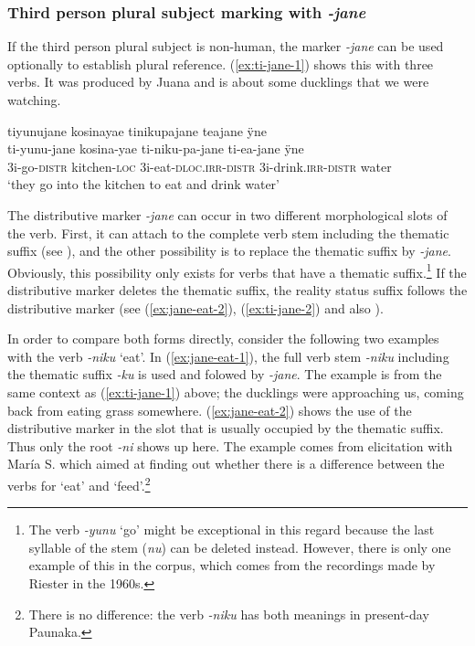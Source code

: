 \subsubsection{Third person plural subject marking with \textit{-jane}} If the third person plural subject is non-human, the marker \textit{-jane} can be used optionally to establish plural reference. (\ref{ex:ti-jane-1}) shows this with three verbs. It was produced by Juana and is about some ducklings that we were watching.
 
 \ea\label{ex:ti-jane-1}
\begingl 
\glpreamble tiyunujane kosinayae tinikupajane teajane ÿne\\
\gla ti-yunu-jane kosina-yae ti-niku-pa-jane ti-ea-jane ÿne\\ 
\glb 3i-go-\textsc{distr} kitchen-\textsc{loc} 3i-eat-\textsc{dloc.irr}-\textsc{distr} 3i-drink.\textsc{irr}-\textsc{distr} water\\ 
\glft ‘they go into the kitchen to eat and drink water’\\ 
\endgl
\trailingcitation{[jxx-e150925l-1.116]}
\xe

The distributive marker \textit{-jane} can occur in two different morphological slots of the verb. First, it can attach to the complete verb stem including the thematic suffix  (see ), and the other possibility is to replace the thematic suffix by \textit{-jane}. Obviously, this possibility only exists for verbs that have a thematic suffix.\footnote{The verb \textit{-yunu} ‘go’ might be exceptional in this regard because the last syllable of the stem (\textit{nu}) can be deleted instead. However, there is only one example of this in the corpus, which comes from the recordings made by Riester in the 1960s.} If the distributive marker deletes the thematic suffix, the reality status suffix follows the distributive marker (see (\ref{ex:jane-eat-2}), (\ref{ex:ti-jane-2}) and also ).

In order to compare both forms directly, consider the following two examples with the verb \textit{-niku} ‘eat’. In (\ref{ex:jane-eat-1}), the full verb stem \textit{-niku} including the thematic suffix \textit{-ku} is used and folowed by \textit{-jane}. The example is from the same context as (\ref{ex:ti-jane-1}) above; the ducklings were approaching us, coming back from eating grass somewhere. (\ref{ex:jane-eat-2}) shows the use of the distributive marker in the slot that is usually occupied by the thematic suffix. Thus only the root \textit{-ni} shows up here. The example comes from elicitation with María S. which aimed at finding out whether there is a difference between the verbs for ‘eat’ and ‘feed’.\footnote{There is no difference: the verb \textit{-niku} has both meanings in present-day Paunaka.}

